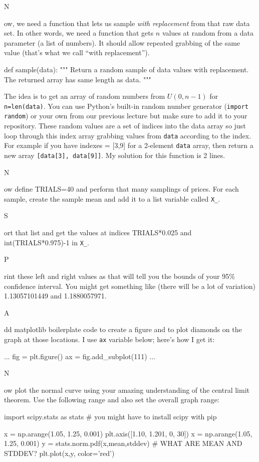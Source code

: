 \documentclass[titlepage]{tufte-book}
\newcounter{problem}
\newcommand{\step}[1]{{}
\vspace{4pt} \noindent {\bf \theproblem. }#1\addtocounter{problem}{1}}
\begin{document}
\begin{fullwidth}
\step Now, we need a function that lets us sample {\em with replacement} from that raw data set. In other words, we need a function that gets $n$ values at random from a data parameter (a list of numbers). It should allow repeated grabbing of the same value (that's what we call ``with replacement'').

\begin{pyverbatim}
def sample(data):
	"""
	Return a random sample of data values with replacement.
	The returned array has same length as data.
	"""
\end{pyverbatim}

The idea is to get an array of random numbers from $U(0,n-1)$ for {\tt n=len(data)}. You can use Python's built-in random number generator ({\tt import random}) or your own from our previous lecture but make sure to add it to your repository.  These random values are a set of indices into the data array so just loop through this index array grabbing values from {\tt data} according to the index. For example if you have indexes = [3,9] for a 2-element {\tt data} array, then return a new array {\tt [data[3], data[9]]}. My solution for this  function is 2 lines.

\step Now define TRIALS=40 and perform that many samplings of prices. For each sample, create the sample mean and add it to a list variable called {\tt X\_}.

\step Sort that list and get the values at indices TRIALS*0.025 and int(TRIALS*0.975)-1 in {\tt X\_}.

\step Print these left and right values as that will tell you the bounds of your 95\% confidence interval. You might get something like (there will be a lot of variation) 1.13057101449 and 1.1880057971.

\step Add matplotlib boilerplate code to create a figure and to plot diamonds on the graph at those locations.  I use {\tt ax} variable below; here's how I get it:
\begin{pyverbatim}
...
fig = plt.figure()
ax = fig.add_subplot(111)
...
\end{pyverbatim}

\step Now plot the normal curve using your amazing understanding of the central limit  theorem. Use the following range and also set the overall graph range:

\begin{pyverbatim}
import scipy.stats as stats # you might have to install scipy with pip

x = np.arange(1.05, 1.25, 0.001)
plt.axis([1.10, 1.201, 0, 30])
x = np.arange(1.05, 1.25, 0.001)
y = stats.norm.pdf(x,mean,stddev)  # WHAT ARE MEAN AND STDDEV?
plt.plot(x,y, color='red')
\end{pyverbatim}


\end{fullwidth}
\end{document}

